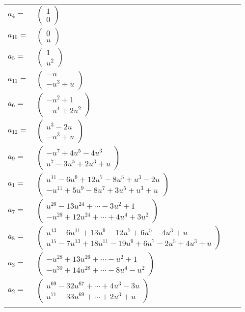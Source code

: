 \documentclass[1p]{elsarticle_modified}
\theoremstyle{definition}
\begin{document}
\begin{tabular}{m{7pt} m{180pt} m{7pt} m{180pt} }
\flushright $a_{4}=$&$\begin{pmatrix}1\\0\end{pmatrix}$ \\
\flushright $a_{10}=$&$\begin{pmatrix}0\\u\end{pmatrix}$ \\
\flushright $a_{5}=$&$\begin{pmatrix}1\\u^2\end{pmatrix}$ \\
\flushright $a_{11}=$&$\begin{pmatrix}- u\\- u^3+u\end{pmatrix}$ \\
\flushright $a_{6}=$&$\begin{pmatrix}- u^2+1\\- u^4+2 u^2\end{pmatrix}$ \\
\flushright $a_{12}=$&$\begin{pmatrix}u^3-2 u\\- u^3+u\end{pmatrix}$ \\
\flushright $a_{9}=$&$\begin{pmatrix}- u^7+4 u^5-4 u^3\\u^7-3 u^5+2 u^3+u\end{pmatrix}$ \\
\flushright $a_{1}=$&$\begin{pmatrix}u^{11}-6 u^9+12 u^7-8 u^5+u^3-2 u\\- u^{11}+5 u^9-8 u^7+3 u^5+u^3+u\end{pmatrix}$ \\
\flushright $a_{7}=$&$\begin{pmatrix}u^{26}-13 u^{24}+\cdots-3 u^2+1\\- u^{26}+12 u^{24}+\cdots+4 u^4+3 u^2\end{pmatrix}$ \\
\flushright $a_{8}=$&$\begin{pmatrix}u^{13}-6 u^{11}+13 u^9-12 u^7+6 u^5-4 u^3+u\\u^{15}-7 u^{13}+18 u^{11}-19 u^9+6 u^7-2 u^5+4 u^3+u\end{pmatrix}$ \\
\flushright $a_{3}=$&$\begin{pmatrix}- u^{28}+13 u^{26}+\cdots- u^2+1\\- u^{30}+14 u^{28}+\cdots-8 u^4- u^2\end{pmatrix}$ \\
\flushright $a_{2}=$&$\begin{pmatrix}u^{69}-32 u^{67}+\cdots+4 u^3-3 u\\u^{71}-33 u^{69}+\cdots+2 u^3+u\end{pmatrix}$\\&\end{tabular}
\end{document}
